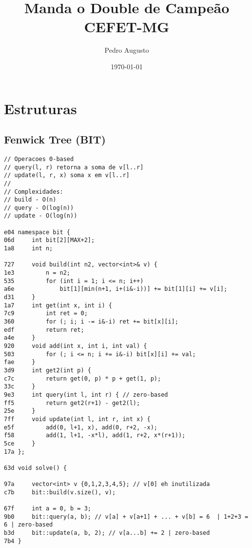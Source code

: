 \documentclass[11pt, a4paper, twoside]{article}
\title{Manda o Double de Campeão \\ CEFET-MG}
\author{Pedro Augusto}
\begin{document}
\twocolumn
\date{\today}
\maketitle


\renewcommand{\contentsname}{Índice} %
\tableofcontents


%
%

\section{Estruturas}

\subsection{Fenwick Tree (BIT)}
\begin{lstlisting}
// Operacoes 0-based
// query(l, r) retorna a soma de v[l..r]
// update(l, r, x) soma x em v[l..r]
//
// Complexidades:
// build - O(n)
// query - O(log(n))
// update - O(log(n))

e04 namespace bit {
06d 	int bit[2][MAX+2];
1a8 	int n;
    
727 	void build(int n2, vector<int>& v) {
1e3 		n = n2;
535 		for (int i = 1; i <= n; i++)
a6e 			bit[1][min(n+1, i+(i&-i))] += bit[1][i] += v[i];
d31 	}
1a7 	int get(int x, int i) {
7c9 		int ret = 0;
360 		for (; i; i -= i&-i) ret += bit[x][i];
edf 		return ret;
a4e 	}
920 	void add(int x, int i, int val) {
503 		for (; i <= n; i += i&-i) bit[x][i] += val;
fae 	}
3d9 	int get2(int p) {
c7c 		return get(0, p) * p + get(1, p);
33c 	}
9e3 	int query(int l, int r) { // zero-based
ff5 		return get2(r+1) - get2(l);
25e 	}
7ff 	void update(int l, int r, int x) {
e5f 		add(0, l+1, x), add(0, r+2, -x);
f58 		add(1, l+1, -x*l), add(1, r+2, x*(r+1));
5ce 	}
17a };

63d void solve() {
    
97a 	vector<int> v {0,1,2,3,4,5}; // v[0] eh inutilizada
c7b 	bit::build(v.size(), v);
    
67f 	int a = 0, b = 3;
9b0 	bit::query(a, b); // v[a] + v[a+1] + ... + v[b] = 6  | 1+2+3 = 6 | zero-based
b3d 	bit::update(a, b, 2); // v[a...b] += 2 | zero-based
7b4 }
\end{lstlisting}
\end{document}
